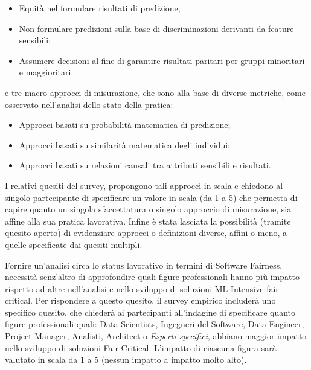 	\begin{itemize}
		\item Equità nel formulare risultati di predizione;
		\item Non formulare predizioni sulla base di discriminazioni derivanti da feature sensibili;
		\item Assumere decisioni al fine di garantire risultati paritari per gruppi minoritari e maggioritari.
	\end{itemize}

	e tre macro approcci di misurazione, che sono alla base di diverse metriche, come osservato nell'analisi dello stato della pratica:
	
	\begin{itemize}
		\item Approcci basati su probabilità matematica di predizione;
		\item Approcci basati su similarità matematica degli individui;
		\item Approcci basati su relazioni causali tra attributi sensibili e risultati.
	\end{itemize}

	I relativi quesiti del survey, propongono tali approcci in scala e chiedono al singolo partecipante di specificare un valore in scala (da 1 a 5) che permetta di capire quanto un singola sfaccettatura o singolo approccio di misurazione, sia affine alla sua pratica lavorativa. Infine è stata lasciata la possibilità (tramite quesito aperto) di evidenziare approcci o definizioni diverse, affini o meno, a quelle specificate dai quesiti multipli.\\
	
	\begin{center}
		\hspace*{-5mm}%
	\end{center}
	
	Fornire un'analisi circa lo status lavorativo in termini di Software Fairness, necessità senz'altro di approfondire quali figure professionali hanno più impatto rispetto ad altre nell'analisi e nello sviluppo di soluzioni ML-Intensive fair-critical. Per rispondere a questo quesito, il survey empirico includerà uno specifico quesito, che chiederà ai partecipanti all'indagine di specificare quanto figure professionali quali: Data Scientists, Ingegneri del Software, Data Engineer, Project Manager, Analisti, Architect o \emph{Esperti specifici}, abbiano maggior impatto nello sviluppo di soluzioni Fair-Critical. L'impatto di ciascuna figura sarà valutato in scala da 1 a 5 (nessun impatto a impatto molto alto).\\
	
